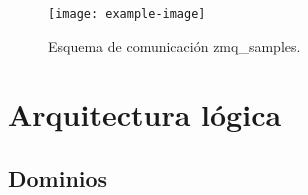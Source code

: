 \begin{figure}[h!]
    \centering
    \texttt{[image: example-image]}
    \caption{Esquema de comunicación zmq\_samples.}
    \label{diag:zmq_samples}
\end{figure}



\section{Arquitectura lógica}
\subsection{Dominios}
    